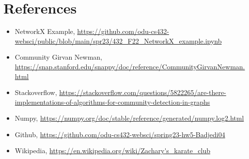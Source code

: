 \documentclass[12pt]{article}
\begin{document}
\clearpage

\section*{References}


\begin{itemize}
    \item {NetworkX Example, \url{https://github.com/odu-cs432-websci/public/blob/main/spr23/432_F22_NetworkX_example.ipynb}}
    \item {Community Girvan Newman, \url{https://snap.stanford.edu/snappy/doc/reference/CommunityGirvanNewman.html}}
    \item {Stackoverflow, \url{https://stackoverflow.com/questions/5822265/are-there-implementations-of-algorithms-for-community-detection-in-graphs}}
    \item {Numpy, \url{https://numpy.org/doc/stable/reference/generated/numpy.log2.html}}
    \item {Github, \url{https://github.com/odu-cs432-websci/spring23-hw5-Badjedi04}}
    \item {Wikipedia, \url{https://en.wikipedia.org/wiki/Zachary's_karate_club}}
\end{itemize}
\end{document}
